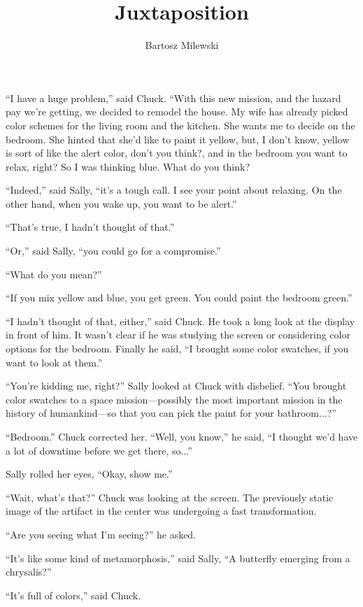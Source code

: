 \documentclass[12pt]{book}
\author{Bartosz Milewski}
\title{Juxtaposition}
\date{}
\begin{document}
\maketitle{}


``I have a huge problem,'' said Chuck. ``With this new mission, and the hazard pay we're getting, we decided to remodel the house. My wife has already picked color schemes for the living room and the kitchen. She wants me to decide on the bedroom. She hinted that she'd like to paint it yellow, but, I don't know, yellow is sort of like the alert color, don't you think?, and in the bedroom you want to relax, right? So I was thinking blue. What do you think?

``Indeed,'' said Sally, ``it's a tough call. I see your point about relaxing. On the other hand, when you wake up, you want to be alert.''

``That's true, I hadn't thought of that.''

``Or,'' said Sally, ``you could go for a compromise.''

``What do you mean?''

``If you mix yellow and blue, you get green. You could paint the bedroom green.''

``I hadn't thought of that, either,'' said Chuck. He took a long look at the display in front of him. It wasn't clear if he was studying the screen or considering color options for the bedroom. Finally he said, ``I brought some color swatches, if you want to look at them.''

``You're kidding me, right?'' Sally looked at Chuck with disbelief. ``You brought color swatches to a space mission---possibly the most important mission in the history of humankind---so that you can pick the paint for your bathroom...?''

``Bedroom.'' Chuck corrected her. ``Well, you know,'' he said, ``I thought we'd have a lot of downtime before we get there, so...''

Sally rolled her eyes, ``Okay, show me.''

``Wait, what's that?'' Chuck was looking at the screen. The previously static image of the artifact in the center was undergoing a fast transformation. 

``Are you seeing what I'm seeing?'' he asked.

``It's like some kind of metamorphosis,'' said Sally, ``A butterfly emerging from a chrysalis?''

``It's full of colors,'' said Chuck. 
\end{document}
